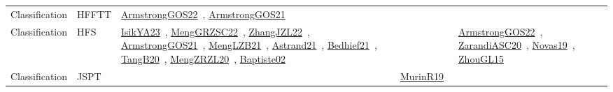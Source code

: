 {\begin{longtable}{lp{3cm}>{\raggedright\arraybackslash}p{6cm}>{\raggedright\arraybackslash}p{6cm}>{\raggedright\arraybackslash}p{8cm}}
\index{HFFTT}\index{Classification!HFFTT}Classification & HFFTT & \href{../works/ArmstrongGOS22.pdf}{ArmstrongGOS22}~\cite{ArmstrongGOS22}, \href{../works/ArmstrongGOS21.pdf}{ArmstrongGOS21}~\cite{ArmstrongGOS21} &  & \\
\index{HFS}\index{Classification!HFS}Classification & HFS & \href{../works/IsikYA23.pdf}{IsikYA23}~\cite{IsikYA23}, \href{../works/MengGRZSC22.pdf}{MengGRZSC22}~\cite{MengGRZSC22}, \href{../works/ZhangJZL22.pdf}{ZhangJZL22}~\cite{ZhangJZL22}, \href{../works/ArmstrongGOS21.pdf}{ArmstrongGOS21}~\cite{ArmstrongGOS21}, \href{../works/MengLZB21.pdf}{MengLZB21}~\cite{MengLZB21}, \href{../works/Astrand21.pdf}{Astrand21}~\cite{Astrand21}, \href{../works/Bedhief21.pdf}{Bedhief21}~\cite{Bedhief21}, \href{../works/TangB20.pdf}{TangB20}~\cite{TangB20}, \href{../works/MengZRZL20.pdf}{MengZRZL20}~\cite{MengZRZL20}, \href{../works/Baptiste02.pdf}{Baptiste02}~\cite{Baptiste02} &  & \href{../works/ArmstrongGOS22.pdf}{ArmstrongGOS22}~\cite{ArmstrongGOS22}, \href{../works/ZarandiASC20.pdf}{ZarandiASC20}~\cite{ZarandiASC20}, \href{../works/Novas19.pdf}{Novas19}~\cite{Novas19}, \href{../works/ZhouGL15.pdf}{ZhouGL15}~\cite{ZhouGL15}\\
\index{JSPT}\index{Classification!JSPT}Classification & JSPT &  & \href{../works/MurinR19.pdf}{MurinR19}~\cite{MurinR19} & \\

\end{longtable}}
